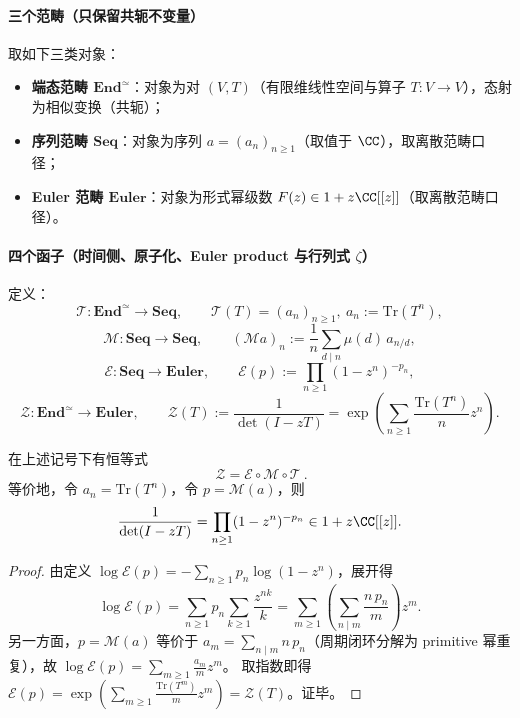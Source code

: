 \paragraph{三个范畴（只保留共轭不变量）}
取如下三类对象：
\begin{itemize}
  \item \textbf{端态范畴 $\mathbf{End}^{\simeq}$}：对象为对 $(V,T)$（有限维线性空间与算子 $T:V\to V$），态射为相似变换（共轭）；
  \item \textbf{序列范畴 $\mathbf{Seq}$}：对象为序列 $a=(a_n)_{n\ge 1}$（取值于 $\CC$），取离散范畴口径；
  \item \textbf{Euler 范畴 $\mathbf{Euler}$}：对象为形式幂级数 $F(z)\in 1+z\CC[[z]]$（取离散范畴口径）。
\end{itemize}

\paragraph{四个函子（时间侧、原子化、Euler product 与行列式 $\zeta$）}
定义：
\[
\mathcal{T}:\mathbf{End}^{\simeq}\to\mathbf{Seq},\qquad
\mathcal{T}(T)=(a_n)_{n\ge 1},\ a_n:=\mathrm{Tr}(T^n),
\]
\[
\mathcal{M}:\mathbf{Seq}\to\mathbf{Seq},\qquad
(\mathcal{M}a)_n:=\frac{1}{n}\sum_{d\mid n}\mu(d)\,a_{n/d},
\]
\[
\mathcal{E}:\mathbf{Seq}\to\mathbf{Euler},\qquad
\mathcal{E}(p):=\prod_{n\ge 1}(1-z^n)^{-p_n},
\]
\[
\mathcal{Z}:\mathbf{End}^{\simeq}\to\mathbf{Euler},\qquad
\mathcal{Z}(T):=\frac{1}{\det(I-zT)}=\exp\!\left(\sum_{n\ge 1}\frac{\mathrm{Tr}(T^n)}{n}z^n\right).
\]

\begin{proposition}\label{prop:time-space-commuting-diagram}
在上述记号下有恒等式
\[
\boxed{\ \mathcal{Z}=\mathcal{E}\circ\mathcal{M}\circ\mathcal{T}\ }.
\]
等价地，令 $a_n=\mathrm{Tr}(T^n)$，令 $p=\mathcal{M}(a)$，则
\[
\frac{1}{\det(I-zT)}=\prod_{n\ge 1}(1-z^n)^{-p_n}\in 1+z\CC[[z]].
\]
\end{proposition}

\begin{proof}
由定义 $\log\mathcal{E}(p)=-\sum_{n\ge 1}p_n\log(1-z^n)$，展开得
\[
\log\mathcal{E}(p)=\sum_{n\ge 1}p_n\sum_{k\ge 1}\frac{z^{nk}}{k}
=\sum_{m\ge 1}\left(\sum_{n\mid m}\frac{n\,p_n}{m}\right)z^m.
\]
另一方面，$p=\mathcal{M}(a)$ 等价于 $a_m=\sum_{n\mid m}n\,p_n$（周期闭环分解为 primitive 幂重复），故
\(
\log\mathcal{E}(p)=\sum_{m\ge 1}\frac{a_m}{m}z^m
\)。
取指数即得 $\mathcal{E}(p)=\exp(\sum_{m\ge 1}\frac{\mathrm{Tr}(T^m)}{m}z^m)=\mathcal{Z}(T)$。证毕。
\end{proof}

